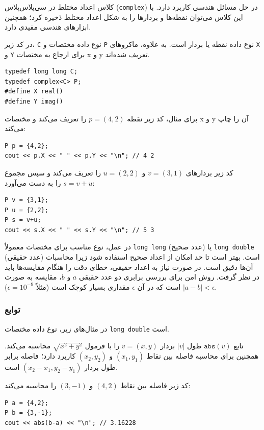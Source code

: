 
کلاس اعداد مختلط در سی‌پلاس‌پلاس (\texttt{complex}) در حل مسائل هندسی کاربرد دارد.
با این کلاس می‌توان نقطه‌ها و بردارها را به شکل اعداد مختلط ذخیره کرد؛
همچنین ابزارهای هندسی مفیدی دارد.

در کد زیر، \texttt{C} نوع داده مختصات و \texttt{P} نوع داده نقطه یا بردار است.
به علاوه، ماکروهای \texttt{X} و \texttt{Y} برای ارجاع به مختصات x و y تعریف شده‌اند.

\begin{lstlisting}
typedef long long C;
typedef complex<C> P;
#define X real()
#define Y imag()
\end{lstlisting}

برای مثال، کد زیر نقطه $p=(4,2)$ را تعریف می‌کند و مختصات x و y آن را چاپ می‌کند:

\begin{lstlisting}
P p = {4,2};
cout << p.X << " " << p.Y << "\n"; // 4 2
\end{lstlisting}

کد زیر بردارهای $v=(3,1)$ و $u=(2,2)$ را تعریف می‌کند و سپس مجموع $s=v+u$ را به دست می‌آورد:

\begin{lstlisting}
P v = {3,1};
P u = {2,2};
P s = v+u;
cout << s.X << " " << s.Y << "\n"; // 5 3
\end{lstlisting}

در عمل،
نوع مناسب برای مختصات معمولاً
\texttt{long long} (عدد صحیح) یا \texttt{long double}
(عدد حقیقی) است.
بهتر است تا حد امکان از اعداد صحیح استفاده شود
زیرا محاسبات آن‌ها دقیق است.
در صورت نیاز به اعداد حقیقی،
خطای دقت را هنگام مقایسه‌ها باید در نظر گرفت.
روش امن برای بررسی برابری دو عدد حقیقی $a$ و $b$،
مقایسه به صورت $|a-b|<\epsilon$ است
که در آن $\epsilon$ مقداری بسیار کوچک است (مثلاً $\epsilon=10^{-9}$).

\subsubsection*{توابع}

در مثال‌های زیر، نوع داده مختصات
\texttt{long double} است.

تابع $\texttt{abs}(v)$ طول $|v|$ بردار $v=(x,y)$ را با فرمول $\sqrt{x^2+y^2}$ محاسبه می‌کند.
همچنین برای محاسبه فاصله بین نقاط $(x_1,y_1)$ و $(x_2,y_2)$ کاربرد دارد؛
فاصله برابر طول بردار $(x_2-x_1,y_2-y_1)$ است.

کد زیر فاصله بین نقاط $(4,2)$ و $(3,-1)$ را محاسبه می‌کند:
\begin{lstlisting}
P a = {4,2};
P b = {3,-1};
cout << abs(b-a) << "\n"; // 3.16228
\end{lstlisting}

